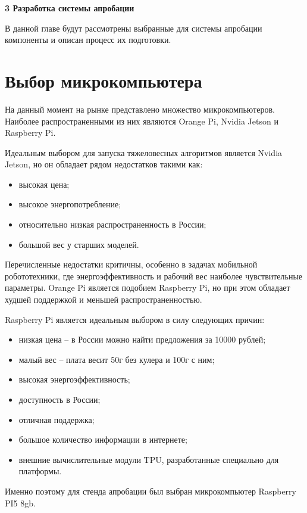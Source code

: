 \newpage
\begin{flushleft}
  \textbf{\large 3 Разработка системы апробации }
\end{flushleft}
В данной главе будут рассмотрены выбранные для системы апробации компоненты и описан процесс их подготовки.

\section{Выбор микрокомпьютера}
На данный момент на рынке представлено множество микрокомпьютеров. Наиболее распространенными из них являются Orange Pi, Nvidia Jetson и Raspberry Pi. 

Идеальным выбором для запуска тяжеловесных алгоритмов является Nvidia Jetson, но он обладает рядом недостатков такими как:
\begin{itemize}
  \item высокая цена;
  \item высокое энергопотребление;
  \item относительно низкая распространенность в России;
  \item большой вес у старших моделей.
\end{itemize}
Перечисленные недостатки критичны, особенно в задачах мобильной робототехники, где энергоэффективность и рабочий вес наиболее чувствительные параметры. 
Orange Pi является подобием Raspberry Pi, но при этом обладает худшей поддержкой и меньшей распространенностью. 

Raspberry Pi является идеальным выбором в силу следующих причин:
\begin{itemize}
  \item низкая цена -- в России можно найти предложения за 10000 рублей;
  \item малый вес -- плата весит 50г без кулера и 100г с ним;
  \item высокая энергоэффективность;
  \item доступность в России;
  \item отличная поддержка;
  \item большое количество информации в интернете;
  \item внешние вычислительные модули TPU, разработанные специально для платформы. 
\end{itemize}

Именно поэтому для стенда апробации был выбран микрокомпьютер Raspberry PI5 8gb.

